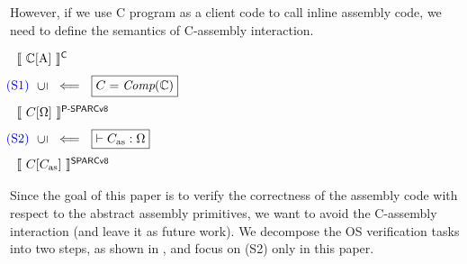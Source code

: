 However, if we use C program as a client code to
call inline assembly code, we need to define the
semantics of C-assembly interaction.
\begin{center}
    $
        \begin{array}{l}
            \semantics{\Clang[\AbsPrimC]}^{\textsf{C}}
            \\
            \\[-5pt]
            \!\!\!\!\!
            {\color{blue} (\text{S1})} \ \
            \rotatebox[origin=c]{90}{$\refine$} \ \
            \Longleftarrow \ \
            \boxed{C = \textit{Comp}(\Clang)}
            \\
            \\[-5pt]
            \semantics{\code[\hprimset]}^{\textsf{P-SPARCv8}}
            \\
            \\[-5pt]
            \!\!\!\!\!
            {\color{blue} (\text{S2})} \ \
            \rotatebox[origin=c]{90}{$\refine$} \ \
            \Longleftarrow \ \
            \boxed{\vdash\asmimp:\hprimset}
            \\
            \\[-5pt]
            \semantics{\code[\asmimp]}^{\textsf{SPARCv8}}
        \end{array}
    $
    \label{fig:idea to establish contextual refinement}
\end{center}

Since the goal of this paper is to verify the correctness of the
assembly code with respect to the abstract assembly primitives,
we want to avoid the C-assembly interaction (and leave it as
future work). We decompose the OS verification tasks into
two steps, as shown in \Fig{\ref{fig:idea to establish contextual refinement}},
and focus on {\color{blue} (S2)} only in this paper.

